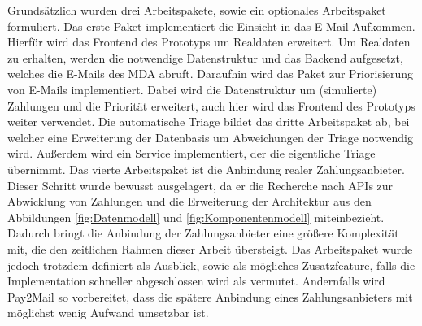 \noindent Grundsätzlich wurden drei Arbeitspakete, sowie ein optionales Arbeitspaket formuliert. Das erste Paket implementiert die Einsicht in das E-Mail Aufkommen. Hierfür wird das Frontend des Prototyps um Realdaten erweitert. Um Realdaten zu erhalten, werden die notwendige Datenstruktur und das Backend aufgesetzt, welches die E-Mails des MDA abruft. Daraufhin wird das Paket zur Priorisierung von E-Mails implementiert. Dabei wird die Datenstruktur um (simulierte) Zahlungen und die Priorität erweitert, auch hier wird das Frontend des Prototyps weiter verwendet. Die automatische Triage bildet das dritte Arbeitspaket ab, bei welcher eine Erweiterung der Datenbasis um Abweichungen der Triage notwendig wird. Außerdem wird ein Service implementiert, der die eigentliche Triage übernimmt. Das vierte Arbeitspaket ist die Anbindung realer Zahlungsanbieter. Dieser Schritt wurde bewusst ausgelagert, da er die Recherche nach APIs zur Abwicklung von Zahlungen und die Erweiterung der Architektur aus den Abbildungen \ref{fig:Datenmodell} und \ref{fig:Komponentenmodell} miteinbezieht. Dadurch bringt die Anbindung der Zahlungsanbieter eine größere Komplexität mit, die den zeitlichen Rahmen dieser Arbeit übersteigt. Das Arbeitspaket wurde jedoch trotzdem definiert als Ausblick, sowie als mögliches Zusatzfeature, falls die Implementation schneller abgeschlossen wird als vermutet. Andernfalls wird Pay2Mail so vorbereitet, dass die spätere Anbindung eines Zahlungsanbieters mit möglichst wenig Aufwand umsetzbar ist. 

